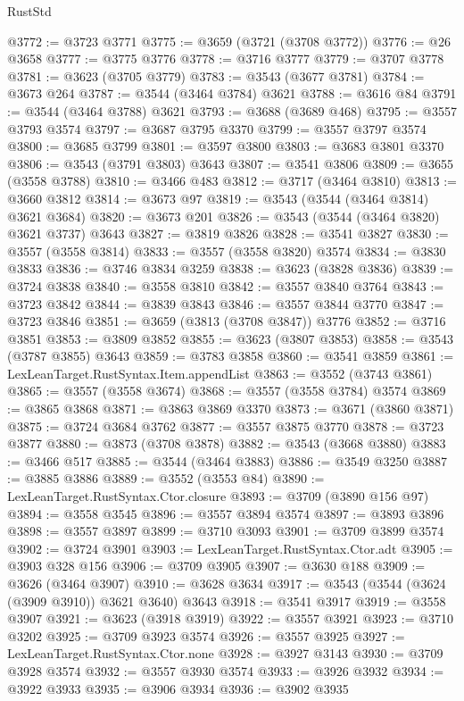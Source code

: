 \begin{lexlean}{RustStd}
\begin{coremodule}
@3772 := @3723 @3771
@3775 := @3659 (@3721 (@3708 @3772))
@3776 := @26 @3658
@3777 := @3775 @3776
@3778 := @3716 @3777
@3779 := @3707 @3778
@3781 := @3623 (@3705 @3779)
@3783 := @3543 (@3677 @3781)
@3784 := @3673 @264
@3787 := @3544 (@3464 @3784) @3621
@3788 := @3616 @84
@3791 := @3544 (@3464 @3788) @3621
@3793 := @3688 (@3689 @468)
@3795 := @3557 @3793 @3574
@3797 := @3687 @3795 @3370
@3799 := @3557 @3797 @3574
@3800 := @3685 @3799
@3801 := @3597 @3800
@3803 := @3683 @3801 @3370
@3806 := @3543 (@3791 @3803) @3643
@3807 := @3541 @3806
@3809 := @3655 (@3558 @3788)
@3810 := @3466 @483
@3812 := @3717 (@3464 @3810)
@3813 := @3660 @3812
@3814 := @3673 @97
@3819 := @3543 (@3544 (@3464 @3814) @3621 @3684)
@3820 := @3673 @201
@3826 := @3543 (@3544 (@3464 @3820) @3621 @3737) @3643
@3827 := @3819 @3826
@3828 := @3541 @3827
@3830 := @3557 (@3558 @3814)
@3833 := @3557 (@3558 @3820) @3574
@3834 := @3830 @3833
@3836 := @3746 @3834 @3259
@3838 := @3623 (@3828 @3836)
@3839 := @3724 @3838
@3840 := @3558 @3810
@3842 := @3557 @3840 @3764
@3843 := @3723 @3842
@3844 := @3839 @3843
@3846 := @3557 @3844 @3770
@3847 := @3723 @3846
@3851 := @3659 (@3813 (@3708 @3847)) @3776
@3852 := @3716 @3851
@3853 := @3809 @3852
@3855 := @3623 (@3807 @3853)
@3858 := @3543 (@3787 @3855) @3643
@3859 := @3783 @3858
@3860 := @3541 @3859
@3861 := LexLeanTarget.RustSyntax.Item.appendList
@3863 := @3552 (@3743 @3861)
@3865 := @3557 (@3558 @3674)
@3868 := @3557 (@3558 @3784) @3574
@3869 := @3865 @3868
@3871 := @3863 @3869 @3370
@3873 := @3671 (@3860 @3871)
@3875 := @3724 @3684 @3762
@3877 := @3557 @3875 @3770
@3878 := @3723 @3877
@3880 := @3873 (@3708 @3878)
@3882 := @3543 (@3668 @3880)
@3883 := @3466 @517
@3885 := @3544 (@3464 @3883)
@3886 := @3549 @3250
@3887 := @3885 @3886
@3889 := @3552 (@3553 @84)
@3890 := LexLeanTarget.RustSyntax.Ctor.closure
@3893 := @3709 (@3890 @156 @97)
@3894 := @3558 @3545
@3896 := @3557 @3894 @3574
@3897 := @3893 @3896
@3898 := @3557 @3897
@3899 := @3710 @3093
@3901 := @3709 @3899 @3574
@3902 := @3724 @3901
@3903 := LexLeanTarget.RustSyntax.Ctor.adt
@3905 := @3903 @328 @156
@3906 := @3709 @3905
@3907 := @3630 @188
@3909 := @3626 (@3464 @3907)
@3910 := @3628 @3634
@3917 := @3543 (@3544 (@3624 (@3909 @3910)) @3621 @3640) @3643
@3918 := @3541 @3917
@3919 := @3558 @3907
@3921 := @3623 (@3918 @3919)
@3922 := @3557 @3921
@3923 := @3710 @3202
@3925 := @3709 @3923 @3574
@3926 := @3557 @3925
@3927 := LexLeanTarget.RustSyntax.Ctor.none
@3928 := @3927 @3143
@3930 := @3709 @3928 @3574
@3932 := @3557 @3930 @3574
@3933 := @3926 @3932
@3934 := @3922 @3933
@3935 := @3906 @3934
@3936 := @3902 @3935

\end{coremodule}
\end{lexlean}
